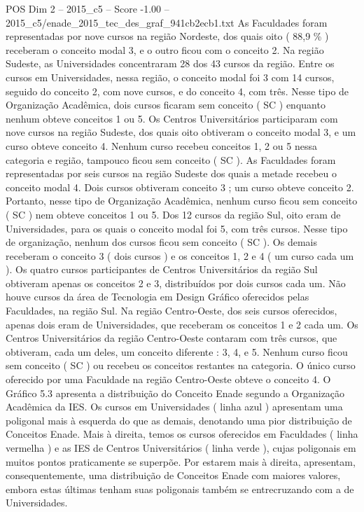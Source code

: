 \begin{textsample}{POS Dim 2 – 2015\_c5 – Score -1.00 – 2015\_c5/enade\_2015\_tec\_des\_graf\_941cb2ecb1.txt}
As Faculdades foram representadas por nove cursos na região Nordeste, dos quais oito ( 88,9 \% ) receberam o conceito modal 3, e o outro ficou com o conceito 2.
Na região Sudeste, as Universidades concentraram 28 dos 43 cursos da região.
Entre os cursos em Universidades, nessa região, o conceito modal foi 3 com 14 cursos, seguido do conceito 2, com nove cursos, e do conceito 4, com três.
Nesse tipo de Organização Acadêmica, dois cursos ficaram sem conceito ( SC ) enquanto nenhum obteve conceitos 1 ou 5.
Os Centros Universitários participaram com nove cursos na região Sudeste, dos quais oito obtiveram o conceito modal 3, e um curso obteve conceito 4.
Nenhum curso recebeu conceitos 1, 2 ou 5 nessa categoria e região, tampouco ficou sem conceito ( SC ).
As Faculdades foram representadas por seis cursos na região Sudeste dos quais a metade recebeu o conceito modal 4.
Dois cursos obtiveram conceito 3 ; um curso obteve conceito 2.
Portanto, nesse tipo de Organização Acadêmica, nenhum curso ficou sem conceito ( SC ) nem obteve conceitos 1 ou 5.
Dos 12 cursos da região Sul, oito eram de Universidades, para os quais o conceito modal foi 5, com três cursos.
Nesse tipo de organização, nenhum dos cursos ficou sem conceito ( SC ).
Os demais receberam o conceito 3 ( dois cursos ) e os conceitos 1, 2 e 4 ( um curso cada um ).
Os quatro cursos participantes de Centros Universitários da região Sul obtiveram apenas os conceitos 2 e 3, distribuídos por dois cursos cada um.
Não houve cursos da área de Tecnologia em Design Gráfico oferecidos pelas Faculdades, na região Sul.
Na região Centro-Oeste, dos seis cursos oferecidos, apenas dois eram de Universidades, que receberam os conceitos 1 e 2 cada um.
Os Centros Universitários da região Centro-Oeste contaram com três cursos, que obtiveram, cada um deles, um conceito diferente : 3, 4, e 5.
Nenhum curso ficou sem conceito ( SC ) ou recebeu os conceitos restantes na categoria.
O único curso oferecido por uma Faculdade na região Centro-Oeste obteve o conceito 4.
O Gráfico 5.3 apresenta a distribuição do Conceito Enade segundo a Organização Acadêmica da IES.
Os cursos em Universidades ( linha azul ) apresentam uma poligonal mais à esquerda do que as demais, denotando uma pior distribuição de Conceitos Enade.
Mais à direita, temos os cursos oferecidos em Faculdades ( linha vermelha ) e as IES de Centros Universitários ( linha verde ), cujas poligonais em muitos pontos praticamente se superpõe.
Por estarem mais à direita, apresentam, consequentemente, uma distribuição de Conceitos Enade com maiores valores, embora estas últimas tenham suas poligonais também se entrecruzando com a de Universidades.

\end{textsample}
